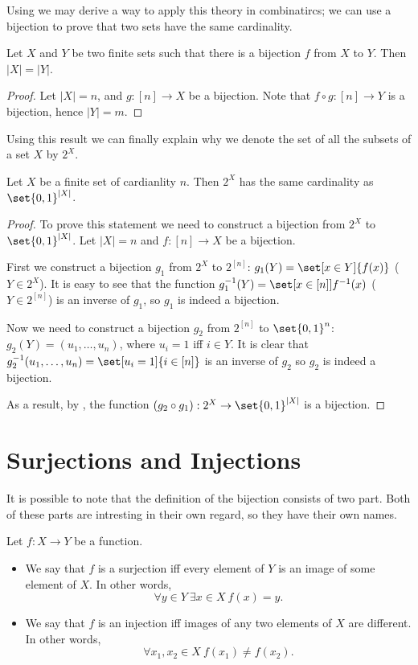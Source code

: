 Using  we may derive a way to apply this
theory in combinatircs; we can use a bijection to prove that two sets have the
same cardinality.
\begin{theorem}
  Let $X$ and $Y$ be two finite sets such that there is a bijection $f$ from
  $X$ to $Y$. Then $|X| = |Y|$.
\end{theorem}
\begin{proof}
  Let $|X| = n$, and $g : [n] \to X$ be a bijection.
  Note that $f \circ g : [n] \to Y$ is a bijection, hence $|Y| = m$.
\end{proof}

Using this result we can finally explain why we denote the set of all the
subsets of a set $X$ by $2^X$.
\begin{corollary}
  Let $X$ be a finite set of cardianlity $n$. Then $2^X$ has the same
  cardinality as $\set{0, 1}^{|X|}$.
\end{corollary}
\begin{proof}
  To prove this statement we need to construct a bijection from $2^X$ to
  $\set{0, 1}^{|X|}$. Let $|X| = n$ and $f : [n] \to X$ be a bijection.

  First we construct a bijection $g_1$ from $2^X$ to $2^{[n]}$:
  $g_1(Y) = \set[x \in Y]{f(x)}$ ($Y \in 2^X$). It is easy to see that the
  function $g^{-1}_1(Y) = \set[x \in [n]]{f^{-1}(x)}$ ($Y \in 2^{[n]}$) is an
  inverse of $g_1$, so $g_1$ is indeed a bijection.

  Now we need to construct a bijection $g_2$ from $2^{[n]}$ to $\set{0, 1}^n$:
  $g_2(Y) = (u_1, \dots, u_n)$, where $u_i = 1$ iff $i \in Y$. It is clear
  that $g^{-1}_2(u_1, \dots, u_n) = \set[u_i = 1]{i \in [n]}$ is an inverse
  of $g_2$ so $g_2$ is indeed a bijection.

  As a result, by , the function
  $(g_2 \circ g_1) : 2^X \to \set{0, 1}^{|X|}$ is a bijection.
\end{proof}

\section{Surjections and Injections}

It is possible to note that the definition of the bijection consists of two part.
Both of these parts are intresting in their own regard, so they have their own
names.
\begin{definition}
  Let $f : X \to Y$ be a function.
  \begin{itemize}
    \item We say that $f$ is a surjection iff every element of $Y$ is an image
      of some element of $X$. In other words,
      $$
          \forall y \in Y~\exists x \in X\ f(x) = y.
      $$
    \item We say that $f$ is an injection iff images of any two elements
      of $X$ are different. In other words,
      $$
          \forall x_1, x_2 \in X\ f(x_1) \neq f(x_2).
      $$
  \end{itemize}
\end{definition}

